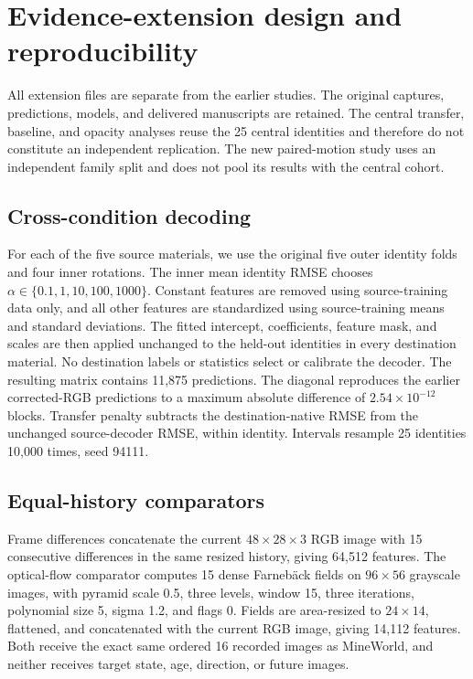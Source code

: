 \section{Evidence-extension design and reproducibility}
\label{app:extension}
All extension files are separate from the earlier studies. The original captures,
predictions, models, and delivered manuscripts are retained. The central transfer,
baseline, and opacity analyses reuse the 25 central identities and therefore do
not constitute an independent replication. The new paired-motion study uses an
independent family split and does not pool its results with the central cohort.

\subsection{Cross-condition decoding}
For each of the five source materials, we use the original five outer identity
folds and four inner rotations. The inner mean identity RMSE chooses
$\alpha\in\{0.1,1,10,100,1000\}$. Constant features are removed using source-training
data only, and all other features are standardized using source-training means
and standard deviations. The fitted intercept, coefficients, feature mask, and
scales are then applied unchanged to the held-out identities in every destination
material. No destination labels or statistics select or calibrate the decoder.
The resulting matrix contains 11,875 predictions. The diagonal reproduces the
earlier corrected-RGB predictions to a maximum absolute difference of
$2.54\times10^{-12}$ blocks. Transfer penalty subtracts the destination-native
RMSE from the unchanged source-decoder RMSE, within identity. Intervals resample
25 identities 10,000 times, seed 94111.

\subsection{Equal-history comparators}
Frame differences concatenate the current $48\times28\times3$ RGB image with
15 consecutive differences in the same resized history, giving 64,512 features.
The optical-flow comparator computes 15 dense Farneb\"ack fields on $96\times56$
grayscale images, with pyramid scale 0.5, three levels, window 15, three
iterations, polynomial size 5, sigma 1.2, and flags 0. Fields are area-resized to
$24\times14$, flattened, and concatenated with the current RGB image, giving
14,112 features. Both receive the exact same ordered 16 recorded images as
MineWorld, and neither receives target state, age, direction, or future images.

